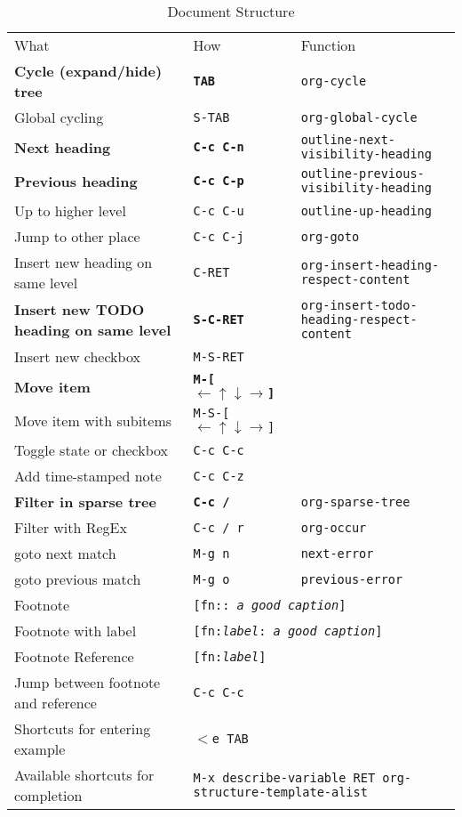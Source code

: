\documentclass[a4paper]{scrartcl}
\begin{document}
\newcommand{\vkcmd}[1]{\texttt{#1}}

\newcommand{\vktableheading}{%
\rowcolor{black}\color{white}
\footnotesize{\sc What} & \color{white}\footnotesize{\sc How} & \color{white}\footnotesize{\sc Function} \\%
}

\newcommand{\vkshortcut}[4]{%
#1 \ifthenelse{\equal{#2}{}}{}{\small{(#2)}} & \vkcmd{#3} & \texttt{\small{#4}} \\
}

\newcommand{\vkishortcut}[4]{%
\vkshortcut{\hspace*{-.4em}\textbf{#1}}{#2}{\textbf{#3}}{#4}%
}

\newcommand{\vkusage}[3]{%
#1 \ifthenelse{\equal{#2}{}}{}{\small{(#2)}} & \multicolumn{2}{l}{\quad\texttt{\small{#3}}} \\
}

\begin{table}[ht]
  \centering
  \caption{Document Structure}
  \label{tab:doc-struct2}
\begin{tabular}{lll}
\vktableheading
\vkishortcut{Cycle (expand/hide) tree}{headlines}{TAB}{org-cycle}
\vkshortcut{Global cycling}{}{S-TAB}{org-global-cycle}
\vkishortcut{Next heading}{}{C-c C-n}{outline-next-visibility-heading}
\vkishortcut{Previous heading}{}{C-c C-p}{outline-previous-visibility-heading}
\vkshortcut{Up to higher level}{}{C-c C-u}{outline-up-heading}
\vkshortcut{Jump to other place}{}{C-c C-j}{org-goto}
\vkshortcut{Insert new heading on same level}{}{C-RET}{org-insert-heading-respect-content}
\vkishortcut{Insert new TODO heading on same level}{}{S-C-RET}{org-insert-todo-heading-respect-content}
\vkshortcut{Insert new checkbox}{}{M-S-RET}{}
\vkishortcut{Move item}{}{M-[$\leftarrow\uparrow\downarrow\rightarrow$]}{}
\vkshortcut{Move item with subitems}{}{M-S-[$\leftarrow\uparrow\downarrow\rightarrow$]}{}
\vkshortcut{Toggle state or checkbox}{}{C-c C-c}{}
\vkshortcut{Add time-stamped note}{}{C-c C-z}{}
\vkishortcut{Filter in sparse tree}{}{C-c /}{org-sparse-tree}
\vkshortcut{Filter with RegEx}{}{C-c / r}{org-occur}
\vkshortcut{goto next match}{sparse tree}{M-g n}{next-error}
\vkshortcut{goto previous match}{sparse tree}{M-g o}{previous-error}
\vkusage{Footnote}{}{[fn:: \emph{a good caption}]}
\vkusage{Footnote with label}{}{[fn:\emph{label}: \emph{a good caption}]}
\vkusage{Footnote Reference}{}{[fn:\emph{label}]}
\vkshortcut{Jump between footnote and reference}{footnote}{C-c C-c}{}
\vkusage{Shortcuts for entering example}{}{$<$e TAB}
\vkusage{Available shortcuts for completion}{}{M-x describe-variable RET org-structure-template-alist}
\end{tabular}
\end{table}
\end{document}
